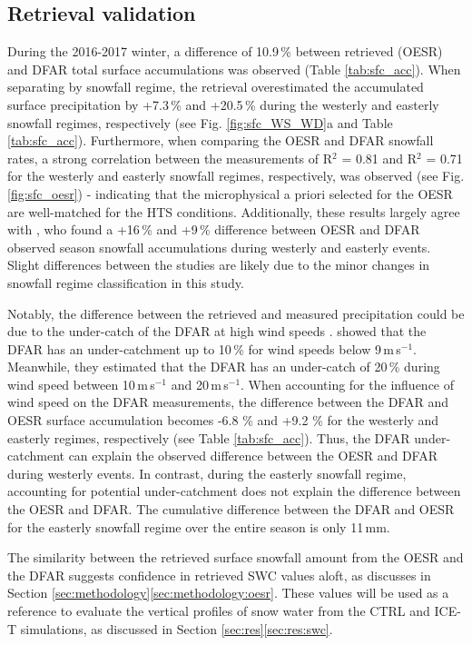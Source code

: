 \documentclass{ametsocV5}
\begin{document}
	\subsection{Retrieval validation}
		During the 2016-2017 winter, a difference of 10.9\,\% between retrieved (OESR) and DFAR total surface accumulations was observed (Table \ref{tab:sfc_acc}). When separating by snowfall regime, the retrieval overestimated the accumulated surface precipitation by +7.3\,\% and +20.5\,\% during the westerly and easterly snowfall regimes, respectively (see Fig. \ref{fig:sfc_WS_WD}a and Table \ref{tab:sfc_acc}). Furthermore, when comparing the OESR and DFAR snowfall rates,  a strong correlation between the measurements of R$^2$ = 0.81 and R$^2$ = 0.71 for the westerly and easterly snowfall regimes, respectively, was observed (see Fig. \ref{fig:sfc_oesr}) - indicating that the microphysical a priori selected for the OESR are well-matched for the HTS conditions. Additionally, these results largely agree with \citet{schirle_estimation_2019}, who found a +16\,\% and +9\,\% difference between OESR and DFAR observed season snowfall accumulations during westerly and easterly events. Slight differences between the studies are likely due to the minor changes in snowfall regime classification in this study.

		Notably, the difference between the retrieved and measured precipitation could be due to the under-catch of the DFAR at high wind speeds \citep{theriault_impact_2015,nitu_iom_2018,colli_adjustments_2020}. \citet{nitu_iom_2018} showed that the DFAR has an under-catchment up to 10\,\% for wind speeds below 9\,m\,s$^{-1}$. Meanwhile, they estimated that the DFAR has an under-catch of 20\,\% during wind speed between 10\,m\,s$^{-1}$ and 20\,m\,s$^{-1}$. When accounting for the influence of wind speed on the DFAR measurements, the difference between the DFAR and OESR surface accumulation becomes -6.8 \% and +9.2 \% for the westerly and easterly regimes, respectively (see Table \ref{tab:sfc_acc}). Thus, the DFAR under-catchment can explain the observed difference between the OESR and DFAR during westerly events. In contrast, during the easterly snowfall regime, accounting for potential under-catchment does not explain the difference between the OESR and DFAR. The cumulative difference between the DFAR and OESR for the easterly snowfall regime over the entire season is only 11\,mm. 

		The similarity between the retrieved surface snowfall amount from the OESR and the DFAR suggests confidence in retrieved SWC values aloft, as discusses in Section \ref{sec:methodology}\ref{sec:methodology:oesr}. These values will be used as a reference to evaluate the vertical profiles of snow water from the CTRL and ICE-T simulations, as discussed in Section \ref{sec:res}\ref{sec:res:swc}.
	
\end{document}
